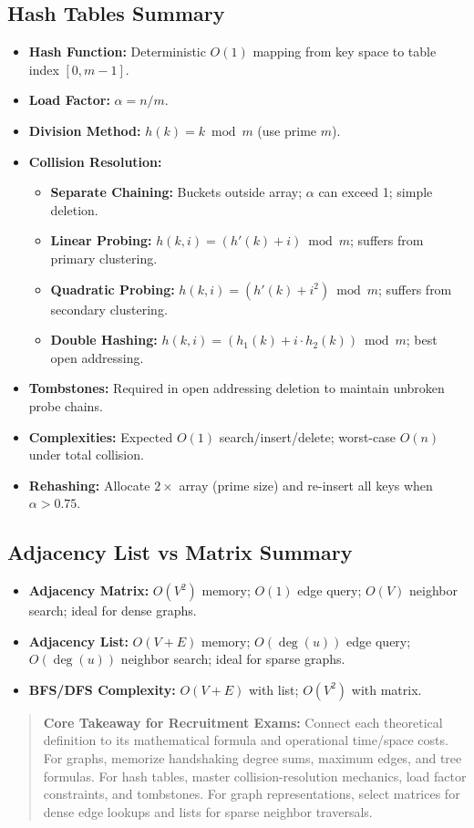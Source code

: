 \subsection{Hash Tables Summary}
\begin{itemize}
    \item \textbf{Hash Function:} Deterministic $O(1)$ mapping from key space to table index $[0, m-1]$.
    \item \textbf{Load Factor:} $\alpha = n / m$.
    \item \textbf{Division Method:} $h(k) = k \bmod m$ (use prime $m$).
    \item \textbf{Collision Resolution:}
    \begin{itemize}
        \item \textbf{Separate Chaining:} Buckets outside array; $\alpha$ can exceed 1; simple deletion.
        \item \textbf{Linear Probing:} $h(k, i) = (h'(k) + i) \bmod m$; suffers from primary clustering.
        \item \textbf{Quadratic Probing:} $h(k, i) = (h'(k) + i^2) \bmod m$; suffers from secondary clustering.
        \item \textbf{Double Hashing:} $h(k, i) = (h_1(k) + i \cdot h_2(k)) \bmod m$; best open addressing.
    \end{itemize}
    \item \textbf{Tombstones:} Required in open addressing deletion to maintain unbroken probe chains.
    \item \textbf{Complexities:} Expected $O(1)$ search/insert/delete; worst-case $O(n)$ under total collision.
    \item \textbf{Rehashing:} Allocate $2\times$ array (prime size) and re-insert all keys when $\alpha > 0.75$.
\end{itemize}

\subsection{Adjacency List vs Matrix Summary}
\begin{itemize}
    \item \textbf{Adjacency Matrix:} $O(V^2)$ memory; $O(1)$ edge query; $O(V)$ neighbor search; ideal for dense graphs.
    \item \textbf{Adjacency List:} $O(V + E)$ memory; $O(\deg(u))$ edge query; $O(\deg(u))$ neighbor search; ideal for sparse graphs.
    \item \textbf{BFS/DFS Complexity:} $O(V + E)$ with list; $O(V^2)$ with matrix.
\end{itemize}

\begin{quote}
\textbf{Core Takeaway for Recruitment Exams:} Connect each theoretical definition to its mathematical formula and operational time/space costs. For graphs, memorize handshaking degree sums, maximum edges, and tree formulas. For hash tables, master collision-resolution mechanics, load factor constraints, and tombstones. For graph representations, select matrices for dense edge lookups and lists for sparse neighbor traversals.
\end{quote}
